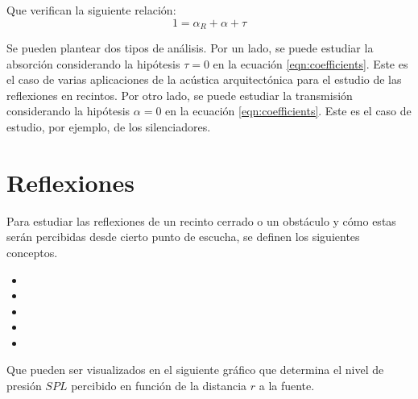 \documentclass[a5paper,12pt,twoside]{book}
\begin{document}
Que verifican la siguiente relación:
\begin{equation}
    1 = \alpha_R + \alpha + \tau
    \label{eqn:coefficients}
\end{equation}

Se pueden plantear dos tipos de análisis. Por un lado, se puede estudiar la absorción considerando la hipótesis $\tau=0$ en la ecuación \ref{eqn:coefficients}. Este es el caso de varias aplicaciones de la acústica arquitectónica para el estudio de las reflexiones en recintos. Por otro lado, se puede estudiar la transmisión considerando la hipótesis $\alpha=0$ en la ecuación \ref{eqn:coefficients}. Este es el caso de estudio, por ejemplo, de los silenciadores.


\section{Reflexiones}

Para estudiar las reflexiones de un recinto cerrado o un obstáculo y cómo estas serán percibidas desde cierto punto de escucha, se definen los siguientes conceptos.

\begin{itemize}
    \item {}
    
    \item {}
    
    \item {}
    
    \item {}
    
    \item {}
\end{itemize}

Que pueden ser visualizados en el siguiente gráfico que determina el nivel de presión $SPL$ percibido en función de la distancia $r$ a la fuente.
\end{document}
